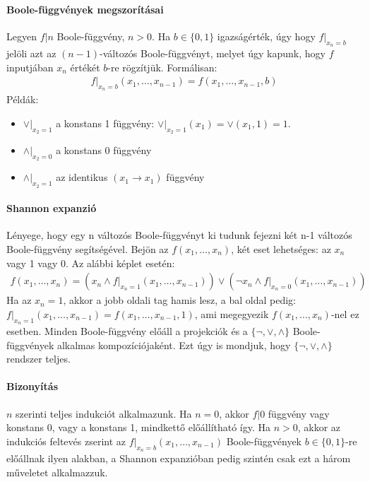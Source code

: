 \documentclass[10pt,a4paper]{article}
\begin{document}
\paragraph{Boole-függvények megszorításai} Legyen $f|n$ Boole-függvény, $n>0$. Ha $b \in \{0,1\}$ igazságérték, úgy hogy $f\vert_{x_{n} = b}$ jelöli azt az $(n-1)$-változós Boole-függvényt, melyet úgy kapunk, hogy $f$ inputjában $x_{n}$ értékét $b$-re rögzítjük. Formálisan:
\begin{equation*}\label{eq:pareto mle2}
  \begin{aligned}
f\vert_{x_{n} = b}(x_{1}, \ldots, x_{n-1}) = f(x_{1}, \ldots, x_{n-1}, b)
 \end{aligned}
\end{equation*}
Példák:
\begin{itemize}
\item $\vee \vert _{x_{2}=1}$ a konstans 1 függvény: $\vee \vert _{x_{2}=1}(x_{1}) = \vee(x_{1}, 1) = 1$.
\item $\wedge \vert _{x_{2}=0}$ a konstans 0 függvény
\item $\wedge \vert _{x_{2}=1}$ az identikus $(x_{1} \rightarrow x_{1})$ függvény
\end{itemize}
\paragraph{Shannon expanzió}
Lényege, hogy egy n változós Boole-függvényt ki tudunk fejezni két n-1 változós Boole-függvény segítségével. Bejön az $f(x_{1}, \ldots, x_{n})$, két eset lehetséges: az $x_n$ vagy 1 vagy 0. Az alábbi képlet esetén:
\begin{equation*}\label{eq:pareto mle2}
  \begin{aligned}
f(x_{1}, \ldots, x_{n}) = (x_n \wedge f\vert_{x_n = 1}(x_{1}, \ldots, x_{n-1})) \vee (\neg x_n \wedge f\vert_{x_n = 0}(x_{1}, \ldots, x_{n-1}))
 \end{aligned}
\end{equation*}
Ha az $x_{n}=1$, akkor a jobb oldali tag hamis lesz, a bal oldal pedig: $f\vert_{x_{n} = 1}(x_{1}, \ldots, x_{n-1}) = f(x_{1}, \ldots, x_{n-1}, 1)$, ami megegyezik $f(x_{1}, \ldots, x_{n})$-nel ez esetben.
Minden Boole-függvény előáll a projekciók és a $\{\neg, \vee, \wedge\}$ Boole-függvények alkalmas kompozíciójaként. Ezt úgy is mondjuk, hogy $\{\neg, \vee, \wedge\}$ rendszer teljes.
\paragraph{Bizonyítás} $n$ szerinti teljes indukciót alkalmazunk. Ha $n = 0$, akkor $f|0$ függvény vagy konstans 0, vagy a konstans 1, mindkettő előállítható így. Ha $n > 0$, akkor az indukciós feltevés zserint az $f\vert_{x_{n} = b}(x_{1}, \ldots, x_{n-1})$ Boole-függvények $b \in \{0,1\}$-re előállnak ilyen alakban, a Shannon expanzióban pedig szintén csak ezt a három műveletet alkalmazzuk.
\end{document}
